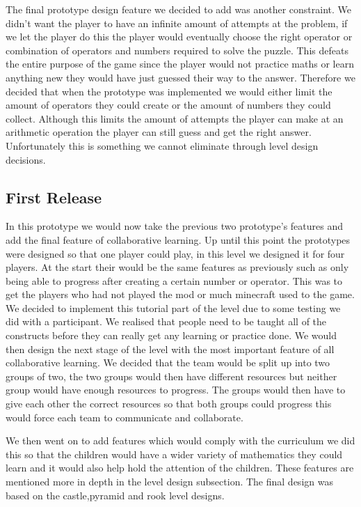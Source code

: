 The final prototype design feature we decided to add was another constraint. We didn’t want the player to have an infinite amount of attempts at the problem, if we let the player do this the player would eventually choose the right operator or combination of operators and numbers required to solve the puzzle. This defeats the entire purpose of the game since the player would not practice maths or learn anything new they would have just guessed their way to the answer. Therefore we decided that when the prototype was implemented we would either limit the amount of operators they could create or the amount of numbers they could collect. Although this limits the amount of attempts the player can make at an arithmetic operation the player can still guess and get the right answer. Unfortunately this is something we cannot eliminate through level design decisions.

\subsection{First Release}
In this prototype we would now take the previous two prototype’s features and add the final feature of collaborative learning. Up until this point the prototypes were designed so that one player could play, in this level we designed it for four players. At the start their would be the same features as previously such as only being able to progress after creating a certain number or operator. This was to get the players who had not played the mod or much minecraft used to the game. We decided to implement this tutorial part of the level due to some testing we did with a participant. We realised that people need to be taught all of the constructs before they can really get any learning or practice done. We would then design the next stage of the level with the most important feature of all collaborative learning. We decided that the team would be split up into two groups of two, the two groups would then have different resources but neither group would have enough resources to progress. The groups would then have to give each other the correct resources so that both groups could progress this would force each team to communicate and collaborate.

We then went on to add features which would comply with the curriculum we did this so that the children would have a wider variety of mathematics they could learn and it would also help hold the attention of the children. These features are mentioned more in depth in the level design subsection. The final design was based on the castle,pyramid and rook level designs.

